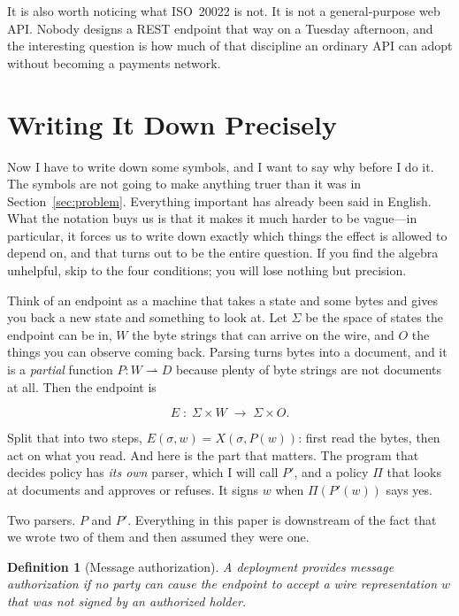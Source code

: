 \documentclass[11pt]{article}
\newtheorem{definition}{Definition}
\begin{document}
It is also worth noticing what ISO~20022 is not. It is not a general-purpose
web API. Nobody designs a REST endpoint that way on a Tuesday afternoon, and
the interesting question is how much of that discipline an ordinary API can
adopt without becoming a payments network.

\section{Writing It Down Precisely}
\label{sec:conditions}

Now I have to write down some symbols, and I want to say why before I do it.
The symbols are not going to make anything truer than it was in
Section~\ref{sec:problem}. Everything important has already been said in
English. What the notation buys us is that it makes it much harder to be
vague---in particular, it forces us to write down exactly which things the
effect is allowed to depend on, and that turns out to be the entire question.
If you find the algebra unhelpful, skip to the four conditions; you will lose
nothing but precision.

Think of an endpoint as a machine that takes a state and some bytes and gives
you back a new state and something to look at. Let $\Sigma$ be the space of
states the endpoint can be in, $W$ the byte strings that can arrive on the
wire, and $O$ the things you can observe coming back. Parsing turns bytes into
a document, and it is a \emph{partial} function $P : W \rightharpoonup D$
because plenty of byte strings are not documents at all. Then the endpoint is

\[
E \;:\; \Sigma \times W \;\to\; \Sigma \times O .
\]

Split that into two steps, $E(\sigma, w) = X(\sigma, P(w))$: first read the
bytes, then act on what you read. And here is the part that matters. The
program that decides policy has \emph{its own} parser, which I will call $P'$,
and a policy $\Pi$ that looks at documents and approves or refuses. It signs
$w$ when $\Pi(P'(w))$ says yes.

Two parsers. $P$ and $P'$. Everything in this paper is downstream of the fact
that we wrote two of them and then assumed they were one.

\begin{definition}[Message authorization]
A deployment provides message authorization if no party can cause the endpoint
to accept a wire representation $w$ that was not signed by an authorized
holder.
\end{definition}
\end{document}
